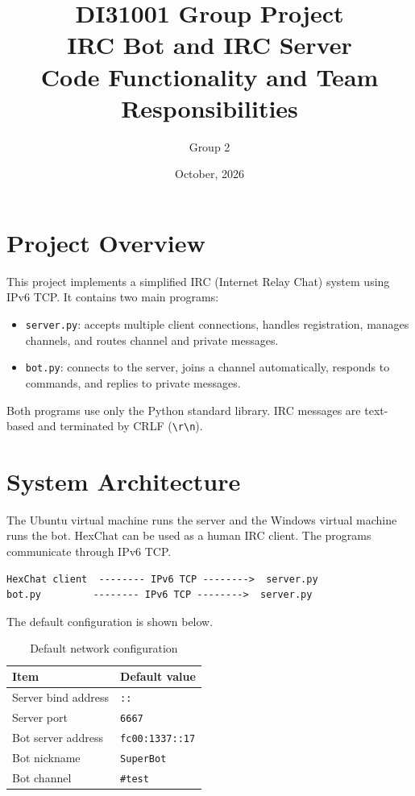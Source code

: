 \documentclass[a4paper,12pt]{article}
\title{
    DI31001 Group Project\\
    IRC Bot and IRC Server\\
    Code Functionality and Team Responsibilities
}
\author{Group 2}
\date{October, 2026}
\begin{document}
\maketitle
\thispagestyle{empty}

\newpage

\section{Project Overview}

This project implements a simplified IRC (Internet Relay Chat) system using IPv6 TCP. It contains two main programs:

\begin{itemize}
    \item \texttt{server.py}: accepts multiple client connections, handles registration, manages channels, and routes channel and private messages.
    \item \texttt{bot.py}: connects to the server, joins a channel automatically, responds to commands, and replies to private messages.
\end{itemize}

Both programs use only the Python standard library. IRC messages are text-based and terminated by CRLF (\texttt{\textbackslash r\textbackslash n}).

\section{System Architecture}

The Ubuntu virtual machine runs the server and the Windows virtual machine runs the bot. HexChat can be used as a human IRC client. The programs communicate through IPv6 TCP.

\begin{verbatim}
HexChat client  -------- IPv6 TCP -------->  server.py
bot.py         -------- IPv6 TCP -------->  server.py
\end{verbatim}

The default configuration is shown below.

\begin{table}[htbp]
\centering
\begin{tabular}{>{\raggedright\arraybackslash}p{5cm}p{7cm}}
\toprule
Item & Default value \\
\midrule
Server bind address & \texttt{::} \\
Server port & \texttt{6667} \\
Bot server address & \texttt{fc00:1337::17} \\
Bot nickname & \texttt{SuperBot} \\
Bot channel & \texttt{\#test} \\
\bottomrule
\end{tabular}
\caption{Default network configuration}
\end{table}
\end{document}

